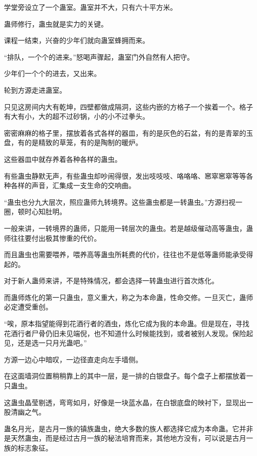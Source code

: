 
\begin{this_body}

学堂旁设立了一个蛊室。蛊室并不大，只有六十平方米。

蛊师修行，蛊虫就是实力的关键。

课程一结束，兴奋的少年们就向蛊室蜂拥而来。

“排队，一个个的进来。”怒喝声骤起，蛊室门外自然有人把守。

少年们一个个的进去，又出来。

轮到方源走进蛊室。

只见这房间内大有乾坤，四壁都做成隔洞，这些内嵌的方格子一个挨着一个。格子有大有小，大的超不过砂锅，小的小不过拳头。

密密麻麻的格子里，摆放着各式各样的器皿，有的是灰色的石盆，有的是青翠的玉盘，有的是精致的草笼，有的是陶制的暖炉。

这些器皿中就存养着各种各样的蛊虫。

有些蛊虫静默无声，有些蛊虫却吵闹得很，发出吱吱吱、咯咯咯、窸窣窸窣等等各种各样的声音，汇集成一支生命的交响曲。

“蛊虫也分九大层次，照应蛊师九转境界。这些蛊虫都是一转蛊虫。”方源扫视一圈，顿时心知肚明。

一般来讲，一转境界的蛊师，只能用一转层次的蛊虫。若是越级催动高等蛊虫，蛊师往往要付出极其惨重的代价。

而且蛊虫也需要喂养，喂养高等蛊虫所耗费的代价，往往也不是低等蛊师能承受得起的。

对于新人蛊师来讲，不是特殊情况，都会选择一转蛊虫进行首次炼化。

而蛊师炼化的第一只蛊虫，意义重大，称之为本命蛊，性命交修。一旦灭亡，蛊师必定遭受重创。

“唉，原本指望能得到花酒行者的酒虫，炼化它成为我的本命蛊。但是现在，寻找花酒行者尸骨仍旧未见端倪，也不知道什么时候能找到，或者被别人发现。保险起见，还是选一只月光蛊吧。”

方源一边心中暗叹，一边径直走向左手墙侧。

在这面墙洞位置稍稍靠上的其中一层，是一排的白银盘子。每个盘子上都摆放着一只蛊虫。

这蛊虫晶莹剔透，弯弯如月，好像是一块蓝水晶，在白银底盘的映衬下，显现出一股清幽之气。

蛊名月光，是古月一族的镇族蛊虫，绝大多数的族人都选择它成为本命蛊。它并非是天然蛊虫，而是经过古月一族的秘法培育而来，其他地方没有，可以说是古月一族的标志象征。


\end{this_body}
